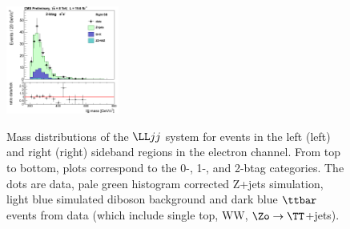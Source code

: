 \begin{figure}[htb]
{\includegraphics[width=0.33\textwidth]{plots/approvalxchecks/Right_2b_eelin.png}
}
\caption{Mass distributions of the $\LL jj$ system for events in the left (left)
 and right (right) sideband regions in the electron channel. From top to bottom, plots
correspond to the 0-, 1-, and 2-btag categories. 
The dots are data, pale green histogram corrected Z+jets simulation,
light blue simulated diboson background and dark blue $\ttbar$ events from data (which
include single top, WW, $\Zo\to\TT$+jets).
\label{fig:lrline}
}
\end{figure}

